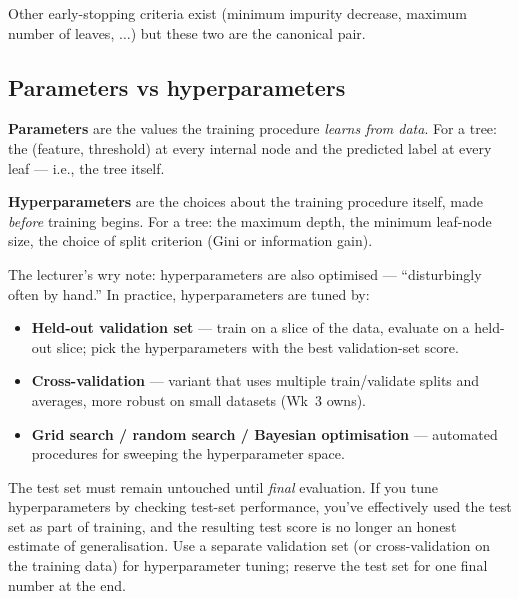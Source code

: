 \documentclass[11pt, a4paper]{article}
\begin{document}
Other early-stopping criteria exist (minimum impurity decrease, maximum number of leaves, $\ldots$) but these two are the canonical pair.

\subsection{Parameters vs hyperparameters}

\begin{defbox}
\textbf{Parameters} are the values the training procedure \emph{learns from data}. For a tree: the (feature, threshold) at every internal node and the predicted label at every leaf — i.e., the tree itself.

\textbf{Hyperparameters} are the choices about the training procedure itself, made \emph{before} training begins. For a tree: the maximum depth, the minimum leaf-node size, the choice of split criterion (Gini or information gain).
\end{defbox}

The lecturer's wry note: hyperparameters are also optimised — ``disturbingly often by hand.'' In practice, hyperparameters are tuned by:

\begin{itemize}
  \item \textbf{Held-out validation set} — train on a slice of the data, evaluate on a held-out slice; pick the hyperparameters with the best validation-set score.
  \item \textbf{Cross-validation} — variant that uses multiple train/validate splits and averages, more robust on small datasets (Wk~3 owns).
  \item \textbf{Grid search / random search / Bayesian optimisation} — automated procedures for sweeping the hyperparameter space.
\end{itemize}

\begin{pitfallbox}
The test set must remain untouched until \emph{final} evaluation. If you tune hyperparameters by checking test-set performance, you've effectively used the test set as part of training, and the resulting test score is no longer an honest estimate of generalisation. Use a separate validation set (or cross-validation on the training data) for hyperparameter tuning; reserve the test set for one final number at the end.
\end{pitfallbox}

\end{document}
